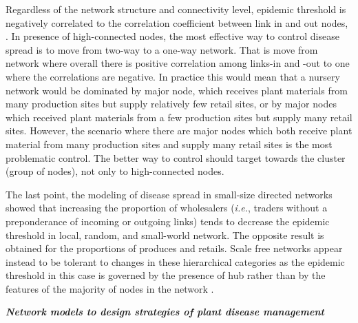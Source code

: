 
Regardless of the network structure and connectivity level, epidemic threshold is negatively correlated to the correlation coefficient between link in and out nodes, \citep{Moslonka2008}. In presence of high-connected nodes, the most effective way to control disease spread is to move from two-way to a one-way network. That is move from network where overall there is positive correlation among links-in and -out to one where the correlations are negative. In practice this would mean that a nursery network would be dominated by major node, which receives plant materials from many production sites but supply relatively few retail sites, or by major nodes which received plant materials from a few production sites but supply many retail sites. However, the scenario where there are major nodes which both receive plant material from many production sites and supply many retail sites is the most problematic control. The better way to control should target towards the cluster (group of nodes), not only to high-connected nodes. 

The last point, the modeling of disease spread in small-size directed networks showed that increasing the proportion of wholesalers (\textit{i.e.}, traders without a preponderance of incoming or outgoing links) tends to decrease the epidemic threshold in local, random, and small-world network. The opposite result is obtained for the proportions of produces and retails. Scale free networks appear instead to be tolerant to changes in these hierarchical categories as the epidemic threshold in this case is governed by the presence of hub rather than by the features of the majority of nodes in the network \citep{Moslonka2010}.

\textit{\textbf{Network models to design strategies of plant disease management}}

